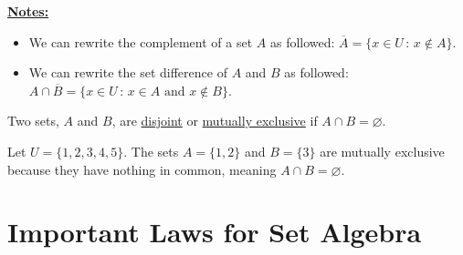     \underline{\textbf{Notes:}}
        \begin{itemize}
            \item We can rewrite the complement of a set $A$ as followed: $\overline{A} = \{ x \in U \, : \, x \not \in A \}$.
            \item We can rewrite the set difference of $A$ and $B$ as followed: $A \cap \overline{B} = \{ x \in U \, : \, x \in A \text{ and } x \not\in B \}$.
        \end{itemize}


    \begin{definition}
    Two sets, $A$ and $B$, are \underline{disjoint} or \underline{mutually exclusive} if $A \cap B = \varnothing$.
    \end{definition}

    \begin{example}
    Let $U= \{ 1 , 2, 3, 4 , 5 \}$. The sets $A = \{ 1 , 2 \}$ and $B = \{ 3 \}$ are mutually exclusive because they have nothing in common, meaning $A \cap B = \varnothing$.
    \end{example}

\newpage 

\section{Important Laws for Set Algebra}
    
